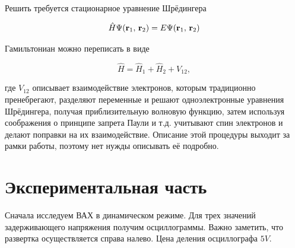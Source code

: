 \documentclass[a4paper,12pt]{article}
\begin{document}
	Решить требуется стационарное уравнение Шрёдингера
	
	\begin{equation}
		\hat{H}\Psi({\bf r}_1,\,{\bf r}_2)=E\Psi({\bf r}_1,\,{\bf r}_2)
	\end{equation}
	
	Гамильтониан можно переписать в виде
	
	\begin{equation}
		\hat{H}=\hat{H}_1+\hat{H}_2+V_{12},
	\end{equation}
	
	где $V_{12}$ описывает взаимодействие электронов, которым традиционно пренебрегают, разделяют переменные и решают одноэлектронные уравнения Шрёдингера, получая приблизительную волновую функцию, затем используя соображения о принципе запрета Паули и т.д. учитывают спин электронов и делают поправки на их взаимодействие. Описание этой процедуры выходит за рамки работы, поэтому нет нужды описывать её подробно.
	
	\section{Экспериментальная часть}
		Сначала исследуем ВАХ в динамическом режиме. Для трех значений задерживающего напряжения получим осциллограммы. Важно заметить, что развертка осуществляется справа налево. Цена деления осциллографа $5V$.
		
\end{document}
